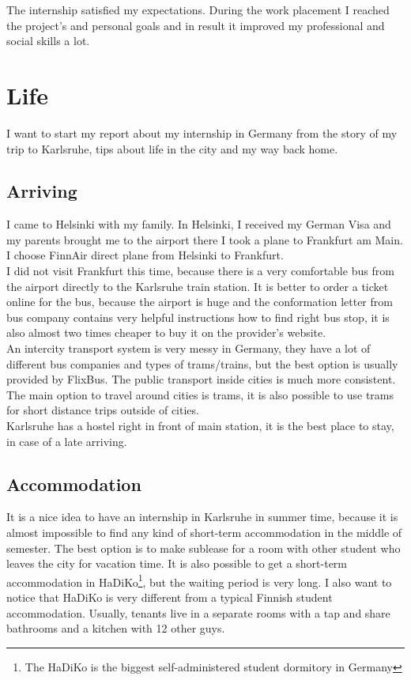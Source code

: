 \documentclass[english]{article}
\begin{document}
The internship satisfied my expectations. During the work placement I reached the project's and personal goals and in result it improved my professional and social skills a lot.


\section{Life}
I want to start my report about my internship in Germany from the story of my trip to Karlsruhe, tips about life in the city and my way back home.

\subsection{Arriving}

I came to Helsinki with my family. In Helsinki, I received my German Visa and my parents brought me to the airport there I took a plane to Frankfurt am Main. I choose FinnAir direct plane from Helsinki to Frankfurt.\\

I did not visit Frankfurt this time, because there is a very comfortable bus from the airport directly to the Karlsruhe train station. It is better to order a ticket online for the bus, because the airport is huge and the conformation letter from bus company contains very helpful instructions how to find right bus stop, it is also almost two times cheaper to buy it on the provider's website.\\

An intercity transport system is very messy in Germany, they have a lot of different bus companies and types of trams/trains, but the best option is usually provided by FlixBus. The public transport inside cities is much more consistent. The main option to travel around cities is trams, it is also possible to use trams for short distance trips outside of cities.\\

Karlsruhe has a hostel right in front of main station, it is the best place to stay, in case of a late arriving.

\subsection{Accommodation}

It is a nice idea to have an internship in Karlsruhe in summer time, because it is almost impossible to find any kind of short-term accommodation in the middle of semester. The best option is to make sublease for a room with other student who leaves the city for vacation time. It is also possible to get a short-term accommodation in HaDiKo\footnote{The HaDiKo is the biggest self-administered student dormitory in Germany}, but the waiting period is very long. I also want to notice that HaDiKo is very different from a typical Finnish student accommodation. Usually, tenants live in a separate rooms with a tap and share bathrooms and a kitchen with 12 other guys. \\
\end{document}
